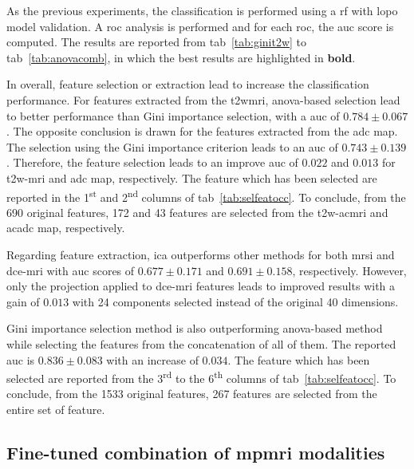 As the previous experiments, the classification is performed using a \ac{rf} with \ac{lopo} model validation.
A \ac{roc} analysis is performed and for each \ac{roc}, the \ac{auc} score is computed.
The results are reported from \acs{tab}~\ref{tab:ginit2w} to \acs{tab}~\ref{tab:anovacomb}, in which the best results are highlighted in \textbf{bold}.

In overall, feature selection or extraction lead to increase the classification performance.
For features extracted from the \ac{t2w}\ac{mri}, \ac{anova}-based selection lead to better performance than Gini importance selection, with a \ac{auc} of $0.784 \pm 0.067$.
The opposite conclusion is drawn for the features extracted from the \ac{adc} map.
The selection using the Gini importance criterion leads to an \ac{auc} of $0.743 \pm 0.139$.
Therefore, the feature selection leads to an improve \ac{auc} of $0.022$ and $0.013$ for \ac{t2w}-\ac{mri} and \ac{adc} map, respectively.
The feature which has been selected are reported in the 1\textsuperscript{st} and 2\textsuperscript{nd} columns of \acs{tab}~\ref{tab:selfeatocc}.
To conclude, from the 690 original features, 172 and 43 features are selected from the \ac{t2w}-ac{mri} and ac{adc} map, respectively.

Regarding feature extraction, \ac{ica} outperforms other methods for both \ac{mrsi} and \ac{dce}-\ac{mri} with \ac{auc} scores of $0.677 \pm 0.171$ and $0.691 \pm 0.158$, respectively.
However, only the projection applied to \ac{dce}-\ac{mri} features leads to improved results with a gain of $0.013$ with 24 components selected instead of the original 40 dimensions.

Gini importance selection method is also outperforming \ac{anova}-based method while selecting the features from the concatenation of all of them.
The reported \ac{auc} is $0.836 \pm 0.083$ with an increase of $0.034$.
The feature which has been selected are reported from the 3\textsuperscript{rd} to the 6\textsuperscript{th} columns of \acs{tab}~\ref{tab:selfeatocc}.
To conclude, from the 1533 original features, 267 features are selected from the entire set of feature.

\subsection{Fine-tuned combination of \ac{mpmri} modalities}\label{subsec:chp6:exp-res:Ex4}

